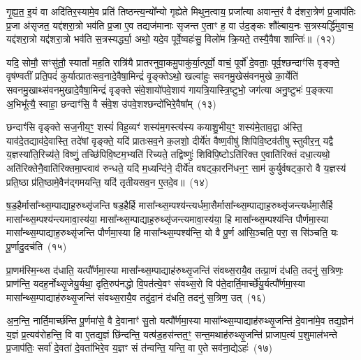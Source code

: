 {%
गृ॒ह्य॒त॒ इ॒यं वा अदि॑तिर॒स्यामे॒व प्रति॑ तिष्ठन्त्य॒न्यो᳚न्यो गृह्येते मिथुन॒त्वाय॒ प्रजा᳚त्या अवान्त॒रं वै द॑शरा॒त्रेण॑ प्र॒जा\-प॑तिः प्र॒जा अ॑सृजत॒ यद्द॑शरा॒त्रो भव॑ति प्र॒जा ए॒व तद्यज॑मानाः सृजन्त ए॒ताꣳ ह॒ वा उ॑द॒ङ्कः शौ᳚ल्बाय॒नः स॒त्रस्यर्द्धि॑मुवाच॒ यद्द॑शरा॒त्रो यद्द॑शरा॒त्रो भव॑ति स॒त्रस्यर्द्ध्या॒ अथो॒ यदे॒व पूर्वे॒ष्वहः॑सु॒ विलो॑म क्रि॒यते॒ तस्यै॒वैषा शान्तिः॑॥~(१२)

{\anuvakamend[{आ॒दि॒त्यस्तस्यै॒व द्वे च॑}]}%

यदि॒ सोमौ॒ सꣳसु॑तौ॒ स्यातां᳚ मह॒ति रात्रि॑यै प्रातरनुवा॒कमु॒पाकु॑र्या॒त्पूर्वो॒ वाचं॒ पूर्वो॑ दे॒वताः॒ पूर्व॒श्छन्दाꣳ॑सि वृङ्क्ते॒ वृष॑ण्वतीं प्रति॒पदं॑ कुर्यात्प्रातःसव॒नादे॒वैषा॒मिन्द्रं॑ वृ॒ङ्क्ते\-ऽथो॒ खल्वा॑हुः सवनमु॒खेस॑वनमुखे का॒र्येति॑ सवनमु॒खाथ्स॑वनमुखादे॒वैषा॒मिन्द्रं॑ वृङ्क्ते संवे॒शायो॑पवे॒शाय॑ गायत्रि॒यास्त्रि॒ष्टुभो॒ जग॑त्या अनु॒ष्टुभः॑ प॒ङ्क्त्या अ॒भिभू᳚त्यै॒ स्वाहा॒ छन्दाꣳ॑सि॒ वै सं॑वे॒श उ॑पवे॒शश्छन्दो॑भिरे॒वैषा᳚म्~(१३)

छन्दाꣳ॑सि वृङ्क्ते सज॒नीय॒ꣳ॒ शस्यं॑ विह॒व्यꣳ॑ शस्य॑म॒गस्त्य॑स्य कयाशु॒भीय॒ꣳ॒ शस्य॑मे॒ताव॒द्वा अ॑स्ति॒ याव॑दे॒तद्याव॑दे॒वास्ति॒ तदे॑षां वृङ्क्ते॒ यदि॑ प्रातःसव॒ने क॒लशो॒ दीर्ये॑त वैष्ण॒वीषु॑ शिपिवि॒ष्टव॑तीषु स्तुवीर॒न्॒ यद्वै य॒ज्ञस्या॑ति॒रिच्य॑ते॒ विष्णुं॒ तच्छि॑पिवि॒ष्टम॒भ्यति॑ रिच्यते॒ तद्विष्णुः॑ शिविपि॒ष्टो\-ऽति॑रिक्त ए॒वाति॑रिक्तं दधा॒त्यथो॒ अति॑रिक्तेनै॒वाति॑रिक्तमा॒प्त्वाव॑ रुन्धते॒ यदि॑ म॒ध्यन्दि॑ने॒ दीर्ये॑त वषट्का॒रनि॑धन॒ꣳ॒ साम॑ कुर्युर्वषट्का॒रो वै य॒ज्ञस्य॑ प्रति॒ष्ठा प्र॑ति॒ष्ठामे॒वैन॑द्गमयन्ति॒ यदि॑ तृतीयसव॒न ए॒तदे॒व॥~(१४)


{\anuvakamend[{छन्दो॑भिरे॒वैषा॒मवैका॒न्नविꣳ॑श॒तिश्च॑}]}%

ष॒ड॒हैर्मासा᳚न्थ्स॒म्पाद्याह॒रुथ्सृ॑जन्ति षड॒हैर्\mbox{}हि मासा᳚न्थ्स॒म्पश्य॑न्त्यर्धमा॒सैर्मासा᳚न्थ्स॒म्पाद्याह॒रुथ्सृ॑जन्त्यर्धमा॒सैर्\mbox{}हि मासा᳚न्थ्स॒म्पश्य॑न्त्यमावा॒स्य॑या॒ मासा᳚न्थ्स॒म्पाद्याह॒रुथ्सृ॑जन्त्यमावा॒स्य॑या॒ हि मासा᳚न्थ्स॒म्पश्य॑न्ति पौर्णमा॒स्या मासा᳚न्थ्स॒म्पाद्याह॒रुथ्सृ॑जन्ति पौर्णमा॒स्या हि मासा᳚न्थ्स॒म्पश्य॑न्ति॒ यो वै पू॒र्ण आ॑सि॒ञ्चति॒ परा॒ स सि॑ञ्चति॒ यः पू॒र्णादु॒दच॑ति~(१५)

प्रा॒णम॑स्मि॒न्थ्स द॑धाति॒ यत्पौ᳚र्णमा॒स्या मासा᳚न्थ्स॒म्पाद्याह॑रुथ्सृ॒जन्ति॑ संवथ्स॒रायै॒व तत्प्रा॒णं द॑धति॒ तदनु॑ स॒त्रिणः॒ प्राण॑न्ति॒ यदह॒र्नोथ्सृ॒जेयु॒र्यथा॒ दृति॒रुप॑नद्धो वि॒पत॑त्ये॒वꣳ सं॑वथ्स॒रो वि प॑ते॒दार्ति॒मार्च्छे॑यु॒र्यत्पौ᳚र्णमा॒स्या मासा᳚न्थ्स॒म्पाद्याह॑रुथ्सृ॒जन्ति॑ संवथ्स॒रायै॒व तदु॑दा॒नं द॑धति॒ तदनु॑ स॒त्रिण॒ उत्~(१६)

अ॒न॒न्ति॒ नार्ति॒मार्च्छ॑न्ति पू॒र्णमा॑से॒ वै दे॒वानाꣳ॑ सु॒तो यत्पौ᳚र्णमा॒स्या मासा᳚न्थ्स॒म्पाद्याह॑रुथ्सृ॒जन्ति॑ दे॒वाना॑मे॒व तद्य॒ज्ञेन॑ य॒ज्ञं प्र॒त्यव॑रोहन्ति॒ वि वा ए॒तद्य॒ज्ञं छि॑न्दन्ति॒ यत्ष॑ड॒हस॑न्तत॒ꣳ॒ सन्त॒मथाह॑रुथ्सृ॒जन्ति॑ प्राजाप॒त्यं प॒शुमाल॑भन्ते प्र॒जा\-प॑तिः॒ सर्वा॑ दे॒वता॑ दे॒वता॑भिरे॒व य॒ज्ञꣳ सं त॑न्वन्ति॒ यन्ति॒ वा ए॒ते सव॑ना॒द्ये\-ऽहः॑~(१७)

}
